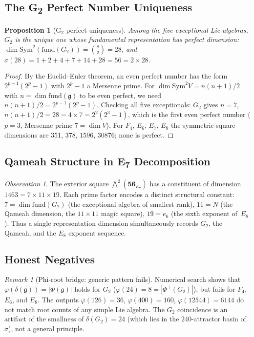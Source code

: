 \documentclass[11pt]{amsart}
\theoremstyle{plain}
\newtheorem{proposition}[theorem]{Proposition}
\theoremstyle{definition}
\theoremstyle{remark}
\newtheorem{remark}[theorem]{Remark}
\newtheorem{observation}[theorem]{Observation}
\newcommand{\fg}{\mathfrak{g}}
\renewcommand{\Phi}{\varPhi}
\begin{document}
\subsection{The G\textsubscript{2} Perfect Number Uniqueness}

\begin{proposition}[G$_2$ perfect uniqueness]\label{prop:g2-perfect}
Among the five exceptional Lie algebras, $G_2$ is the unique one
whose fundamental representation has perfect dimension:
$\dim\mathrm{Sym}^2(\mathrm{fund}(G_2)) = \binom{8}{2} = 28$,
and $\sigma(28) = 1 + 2 + 4 + 7 + 14 + 28 = 56 = 2 \times 28$.
\end{proposition}

\begin{proof}
By the Euclid--Euler theorem, an even perfect number has the form
$2^{p-1}(2^p - 1)$ with $2^p - 1$ a Mersenne prime.  For
$\dim\mathrm{Sym}^2 V = n(n+1)/2$ with $n = \dim\mathrm{fund}(\fg)$
to be even perfect, we need $n(n+1)/2 = 2^{p-1}(2^p-1)$.
Checking all five exceptionals: $G_2$ gives $n=7$, $n(n+1)/2 = 28
= 4 \times 7 = 2^2(2^3-1)$, which is the first even perfect number
($p=3$, Mersenne prime $7 = \dim V$).
For $F_4$, $E_6$, $E_7$, $E_8$ the symmetric-square dimensions are
$351$, $378$, $1596$, $30876$; none is perfect.
\end{proof}

\subsection{Qameah Structure in E\textsubscript{7} Decomposition}

\begin{observation}\label{obs:1463-qameah}
The exterior square $\bigwedge^2(\mathbf{56}_{E_7})$ has a constituent
of dimension $1463 = 7 \times 11 \times 19$.  Each prime factor
encodes a distinct structural constant:
$7 = \dim\mathrm{fund}(G_2)$ (the exceptional algebra of smallest rank),
$11 = N$ (the Qameah dimension, the $11 \times 11$ magic square),
$19 = e_6$ (the sixth exponent of~$E_8$).
Thus a single representation dimension simultaneously records $G_2$,
the Qameah, and the $E_8$ exponent sequence.
\end{observation}

\subsection{Honest Negatives}

\begin{remark}[Phi-root bridge: generic pattern fails]\label{rem:phi-bridge-hn}
Numerical search shows that $\varphi(\delta(\fg)) = |\Phi(\fg)|$ holds
for $G_2$ ($\varphi(24) = 8 = |\Phi^+(G_2)|$), but fails for $F_4$,
$E_6$, and $E_8$.  The outputs $\varphi(126) = 36$,
$\varphi(400) = 160$, $\varphi(12544) = 6144$ do not match root counts
of any simple Lie algebra.  The $G_2$ coincidence is an artifact of the
smallness of $\delta(G_2) = 24$ (which lies in the $240$-attractor
basin of $\sigma$), not a general principle.
\end{remark}
\end{document}
